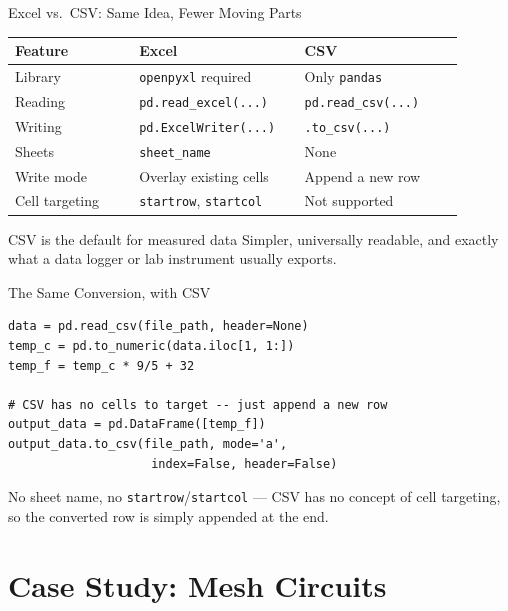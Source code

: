 \documentclass[9pt,aspectratio=169,xcolor=table]{beamer}
\newcommand{\striped}{\rowcolors{1}{white}{stripe}}
\begin{document}
\begin{frame}{Excel vs.\ CSV: Same Idea, Fewer Moving Parts}
    \leavevmode
    \small
    \striped
    \begin{tabular}{@{}p{0.25\linewidth}p{0.32\linewidth}p{0.32\linewidth}@{}}
        \toprule
        \textbf{Feature} & \textbf{Excel} & \textbf{CSV} \\
        \midrule
        Library & \texttt{openpyxl} required & Only \texttt{pandas} \\
        Reading & \texttt{pd.read\_excel(...)} & \texttt{pd.read\_csv(...)} \\
        Writing & \texttt{pd.ExcelWriter(...)} & \texttt{.to\_csv(...)} \\
        Sheets & \texttt{sheet\_name} & None \\
        Write mode & Overlay existing cells & Append a new row \\
        Cell targeting & \texttt{startrow}, \texttt{startcol} & Not supported \\
        \bottomrule
    \end{tabular}

    \vspace{3mm}
    \begin{alertblock}{CSV is the default for measured data}
        Simpler, universally readable, and exactly what a data
        logger or lab instrument usually exports.
    \end{alertblock}
\end{frame}

\begin{frame}[fragile]{The Same Conversion, with CSV}
    \leavevmode
\begin{lstlisting}
data = pd.read_csv(file_path, header=None)
temp_c = pd.to_numeric(data.iloc[1, 1:])
temp_f = temp_c * 9/5 + 32

# CSV has no cells to target -- just append a new row
output_data = pd.DataFrame([temp_f])
output_data.to_csv(file_path, mode='a',
                    index=False, header=False)
\end{lstlisting}

    \vspace{2mm}
    {\small No sheet name, no \texttt{startrow}/\texttt{startcol} ---
    CSV has no concept of cell targeting, so the converted row is
    simply appended at the end.}
\end{frame}

\section{Case Study: Mesh Circuits}
\end{document}
